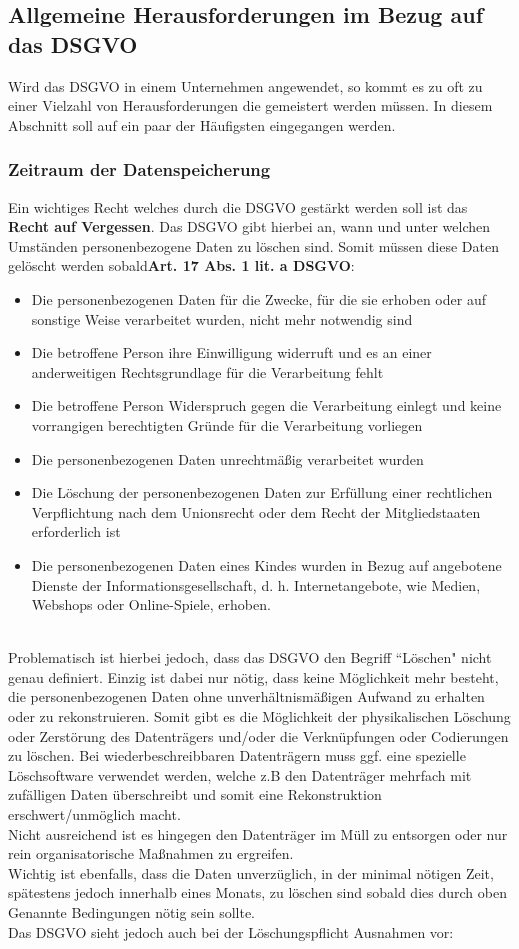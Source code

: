 \documentclass[a4paper, 12pt]{article}
\begin{document}
\subsection{Allgemeine Herausforderungen im Bezug auf das DSGVO}
Wird das DSGVO in einem Unternehmen angewendet, so kommt es zu oft zu einer Vielzahl von Herausforderungen die gemeistert werden müssen. In diesem Abschnitt soll auf ein paar der Häufigsten eingegangen werden.


\subsubsection{Zeitraum der Datenspeicherung}
Ein wichtiges Recht welches durch die DSGVO gestärkt werden soll ist das \textbf{Recht auf Vergessen}. Das DSGVO gibt hierbei an, wann und unter welchen Umständen personenbezogene Daten zu löschen sind. Somit müssen diese Daten gelöscht werden sobald\textbf{Art. 17 Abs. 1 lit. a DSGVO}:
\begin{itemize}
	\item Die personenbezogenen Daten für die Zwecke, für die sie erhoben oder auf sonstige Weise verarbeitet wurden, nicht mehr notwendig sind
	\item Die betroffene Person ihre Einwilligung widerruft und es an einer anderweitigen Rechtsgrundlage für die Verarbeitung fehlt
	\item Die betroffene Person Widerspruch gegen die Verarbeitung einlegt und keine vorrangigen berechtigten Gründe für die Verarbeitung vorliegen
	\item Die personenbezogenen Daten unrechtmäßig verarbeitet wurden
	\item Die Löschung der personenbezogenen Daten zur Erfüllung einer rechtlichen Verpflichtung nach dem Unionsrecht oder dem Recht der Mitgliedstaaten erforderlich ist
	\item Die personenbezogenen Daten eines Kindes wurden in Bezug auf angebotene Dienste der Informationsgesellschaft, d. h. Internetangebote, wie Medien, Webshops oder Online-Spiele, erhoben.
\end{itemize}\cite{datenschutz_internet}\\
Problematisch ist hierbei jedoch, dass das DSGVO den Begriff ``Löschen" nicht genau definiert. Einzig ist dabei nur nötig, dass keine Möglichkeit mehr besteht, die personenbezogenen Daten ohne unverhältnismäßigen Aufwand zu erhalten oder zu rekonstruieren. Somit gibt es die Möglichkeit der physikalischen Löschung oder Zerstörung des Datenträgers und/oder die Verknüpfungen oder Codierungen zu löschen. Bei wiederbeschreibbaren Datenträgern muss ggf. eine spezielle Löschsoftware verwendet werden, welche z.B den Datenträger mehrfach mit zufälligen Daten überschreibt und somit eine Rekonstruktion erschwert/unmöglich macht.\\Nicht ausreichend ist es hingegen den Datenträger im Müll zu entsorgen oder nur rein organisatorische Maßnahmen zu ergreifen.\\Wichtig ist ebenfalls, dass die Daten unverzüglich, in der minimal nötigen Zeit, spätestens jedoch innerhalb eines Monats, zu löschen sind sobald dies durch oben Genannte Bedingungen nötig sein sollte.\\Das DSGVO sieht jedoch auch bei der Löschungspflicht Ausnahmen vor:
\end{document}
